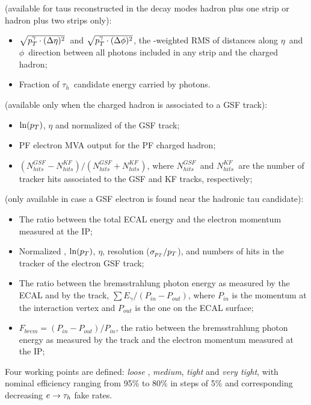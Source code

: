  (available for taus reconstructed in the decay modes hadron plus one strip or hadron plus two strips only):
\begin{itemize}
\item $\sqrt{p_{T}^{\gamma} \cdot (\Delta\eta)^{2}}$\ and $\sqrt{p_{T}^{\gamma} \cdot (\Delta\phi)^{2}}$, 
  the \pT-weighted RMS of distances along $\eta$\ and $\phi$\ direction between all photons included in any strip and the charged hadron;
\item Fraction of $\tau_{h}$\ candidate energy carried by photons.
\end{itemize}

 (available only when the charged hadron is associated to a GSF track):
\begin{itemize}
\item $\ln (p_{T})$, $\eta$ and normalized \chisq of the GSF track;
\item PF electron MVA output for the PF charged hadron;
\item $(N_{hits}^{GSF} - N_{hits}^{KF})/(N_{hits}^{GSF} + N_{hits}^{KF})$, where $N_{hits}^{GSF}$\ and $N_{hits}^{KF}$\ are the number of tracker hits associated to the GSF and KF tracks, respectively;
\end{itemize}

 (only available in case a GSF electron is found near the hadronic tau candidate):
\begin{itemize}
\item The ratio between the total ECAL energy and the electron momentum measured at the IP;
\item Normalized \chisq, $\ln (p_{T})$, $\eta$, \pT resolution ($\sigma_{p_{T}}/p_{T}$), and numbers of hits in the tracker of the electron GSF track;
\item The ratio between the bremsstrahlung photon energy as measured by the ECAL and by the track, $\sum E_{\gamma}/(P_{in}-P_{out})$, where $P_{in}$ is the momentum at the interaction vertex and $P_{out}$ is the one on the ECAL surface;
\item $F_{brem}=(P_{in}-P_{out})/P_{in}$, the ratio between the bremsstrahlung photon energy as measured by the track and the electron momentum measured at the IP;
\end{itemize}

Four working points are defined: \emph{loose }, \emph{medium}, \emph{tight} and \emph{very tight}, with nominal efficiency ranging from 95\% to 80\% in steps of 5\% and corresponding decreasing $e \rightarrow \tau_h$ fake rates. %

